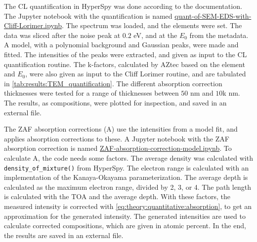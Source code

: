 The CL quantification in HyperSpy was done according to the documentation.
The Jupyter notebook with the quantification is named \href{https://github.com/brynjarmorka/eds-sem-bulk-corrections/blob/main/quant-of-SEM-EDS-with-Cliff-Lorimer.ipynb}{quant-of-SEM-EDS-with-Cliff-Lorimer.ipynb}.
The spectrum was loaded, and the elements were set.
The data was sliced after the noise peak at $0.2$ eV, and at the $E_0$ from the metadata.
A model, with a polynomial background and Gaussian peaks, were made and fitted.
The intensities of the peaks were extracted, and given as input to the CL quantification routine.
The k-factors, calculated by AZtec based on the element and $E_0$, were also given as input to the Cliff Lorimer routine, and are tabulated in \cref{tab:results:TEM_quantification}.
The different absorption correction thicknesses were tested for a range of thicknesses between $50$ nm and $10$k nm.
The results, as compositions, were plotted for inspection, and saved in an external file.

The ZAF absorption corrections (A) use the intensities from a model fit, and applies absorption corrections to these.
A Jupyter notebook with the ZAF absorption correction is named \href{https://github.com/brynjarmorka/eds-sem-bulk-corrections/blob/main/ZAF-absorption-correction-model.ipynb}{ZAF-absorption-correction-model.ipynb}.
To calculate A, the code needs some factors. 
The average density was calculated with \verb|density_of_mixture()| from HyperSpy.
The electron range is calculated with an implementation of the Kanaya-Okayama parameterization.
The average depth is calculated as the maximum electron range, divided by 2, 3, or 4.
The path length is calculated with the TOA and the average depth.
With these factors, the measured intensity is corrected with \cref{eq:theory:quantitative:absorption}, to get an approximation for the generated intensity. 
The generated intensities are used to calculate corrected compositions, which are given in atomic percent.
In the end, the results are saved in an external file.


